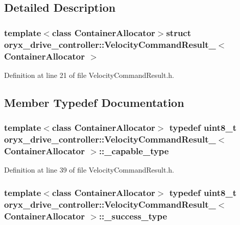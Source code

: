 \subsection{\-Detailed \-Description}
\subsubsection*{template$<$class \-Container\-Allocator$>$struct oryx\-\_\-drive\-\_\-controller\-::\-Velocity\-Command\-Result\-\_\-$<$ Container\-Allocator $>$}



\-Definition at line 21 of file \-Velocity\-Command\-Result.\-h.



\subsection{\-Member \-Typedef \-Documentation}
\subsubsection[{\-\_\-capable\-\_\-type}]{\setlength{\rightskip}{0pt plus 5cm}template$<$class \-Container\-Allocator$>$ typedef uint8\-\_\-t {\bf oryx\-\_\-drive\-\_\-controller\-::\-Velocity\-Command\-Result\-\_\-}$<$ \-Container\-Allocator $>$\-::{\bf \-\_\-capable\-\_\-type}}\label{structoryx__drive__controller_1_1VelocityCommandResult___ada380c47f5dc75b672afb03246bffc33}


\-Definition at line 39 of file \-Velocity\-Command\-Result.\-h.

\subsubsection[{\-\_\-success\-\_\-type}]{\setlength{\rightskip}{0pt plus 5cm}template$<$class \-Container\-Allocator$>$ typedef uint8\-\_\-t {\bf oryx\-\_\-drive\-\_\-controller\-::\-Velocity\-Command\-Result\-\_\-}$<$ \-Container\-Allocator $>$\-::{\bf \-\_\-success\-\_\-type}}\label{structoryx__drive__controller_1_1VelocityCommandResult___a7aab90690a4a3367a5e13dc512253f1b}


